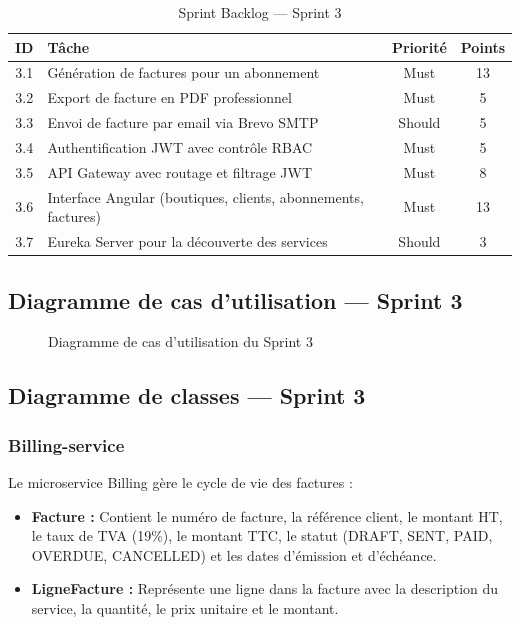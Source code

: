 \begin{table}[H]
\centering
\renewcommand{\arraystretch}{1.2}
\begin{tabular}{|c|p{9cm}|c|c|}
\hline
\textbf{ID} & \textbf{Tâche} & \textbf{Priorité} & \textbf{Points} \\
\hline
3.1 & Génération de factures pour un abonnement & Must & 13 \\
\hline
3.2 & Export de facture en PDF professionnel & Must & 5 \\
\hline
3.3 & Envoi de facture par email via Brevo SMTP & Should & 5 \\
\hline
3.4 & Authentification JWT avec contrôle RBAC & Must & 5 \\
\hline
3.5 & API Gateway avec routage et filtrage JWT & Must & 8 \\
\hline
3.6 & Interface Angular (boutiques, clients, abonnements, factures) & Must & 13 \\
\hline
3.7 & Eureka Server pour la découverte des services & Should & 3 \\
\hline
\end{tabular}
\caption{Sprint Backlog --- Sprint 3}
\label{tab:sprint3_backlog}
\end{table}

\subsection{Diagramme de cas d'utilisation --- Sprint 3}

\begin{figure}[H]
    \centering
    \caption{Diagramme de cas d'utilisation du Sprint 3}
    \label{fig:uc_sprint3}
\end{figure}

\subsection{Diagramme de classes --- Sprint 3}

\subsubsection{Billing-service}
Le microservice Billing gère le cycle de vie des factures :
\begin{itemize}
    \item \textbf{Facture :} Contient le numéro de facture, la référence client, le montant HT, le taux de TVA (19\%), le montant TTC, le statut (DRAFT, SENT, PAID, OVERDUE, CANCELLED) et les dates d'émission et d'échéance.
    \item \textbf{LigneFacture :} Représente une ligne dans la facture avec la description du service, la quantité, le prix unitaire et le montant.
\end{itemize}

